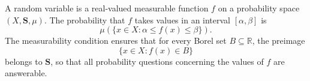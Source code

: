 A random variable is a real-valued measurable function $f$ on a probability space $(X, \mathbf{S}, \mu)$. The probability that $f$ takes values in an interval $[\alpha, \beta]$ is
$$\mu\left(\{x \in X : \alpha \leq f(x) \leq \beta\}\right).$$
The measurability condition ensures that for every Borel set $B \subseteq \mathbb{R}$, the preimage
$$\{x \in X : f(x) \in B\}$$
belongs to $\mathbf{S}$, so that all probability questions concerning the values of $f$ are answerable.

